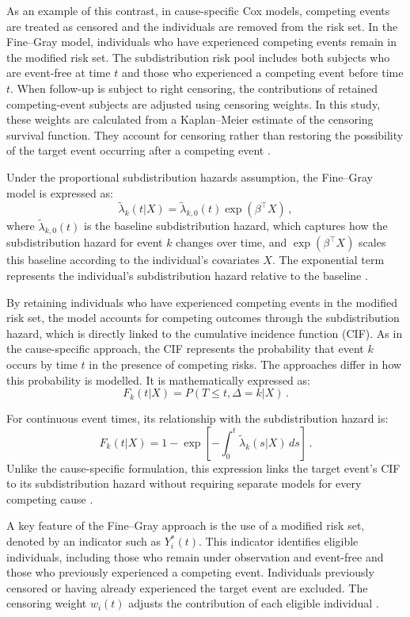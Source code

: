 \documentclass[a4paper,twoside,12pt]{report}
\begin{document}
As an example of this contrast, in cause-specific Cox models, competing events are treated as censored and the individuals are removed from the risk set. In the Fine--Gray model, individuals who have experienced competing events remain in the modified risk set. The subdistribution risk pool includes both subjects who are event-free at time $t$ and those who experienced a competing event before time $t$. When follow-up is subject to right censoring, the contributions of retained competing-event subjects are adjusted using censoring weights. In this study, these weights are calculated from a Kaplan--Meier estimate of the censoring survival function. They account for censoring rather than restoring the possibility of the target event occurring after a competing event \citep{FineGray1999}.

Under the proportional subdistribution hazards assumption, the Fine--Gray model is expressed as:
$$\tilde{\lambda}_k(t|X)=\tilde{\lambda}_{k,0}(t)\exp(\beta^\top X) \,,$$
where $\tilde{\lambda}_{k,0}(t)$ is the baseline subdistribution hazard, which captures how the subdistribution hazard for event $k$ changes over time, and $\exp(\beta^\top X)$ scales this baseline according to the individual's covariates $X$. The exponential term represents the individual's subdistribution hazard relative to the baseline \citep{FineGray1999}.

By retaining individuals who have experienced competing events in the modified risk set, the \cite{FineGray1999} model accounts for competing outcomes through the subdistribution hazard, which is directly linked to the cumulative incidence function (CIF). As in the cause-specific approach, the CIF represents the probability that event $k$ occurs by time $t$ in the presence of competing risks. The approaches differ in how this probability is modelled. It is mathematically expressed as:
$$F_k(t|X) = P(T \le t, \Delta=k|X) \,.$$

For continuous event times, its relationship with the subdistribution hazard is:
$$F_k(t|X) = 1-\exp\left[-\int_0^t \tilde{\lambda}_k(s|X)\,ds\right] \,.$$
Unlike the cause-specific formulation, this expression links the target event's CIF to its subdistribution hazard without requiring separate models for every competing cause \citep{FineGray1999}.

A key feature of the Fine--Gray approach is the use of a modified risk set, denoted by an indicator such as $Y_i^*(t)$. This indicator identifies eligible individuals, including those who remain under observation and event-free and those who previously experienced a competing event. Individuals previously censored or having already experienced the target event are excluded. The censoring weight $w_i(t)$ adjusts the contribution of each eligible individual \citep{FineGray1999}.
\end{document}
